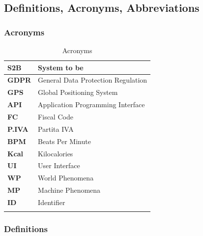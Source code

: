 \documentclass[titlepage]{article}
\begin{document}
	\subsection{Definitions, Acronyms, Abbreviations}
		
		\subsubsection{Acronyms}
	
		\begin{longtable}{| p{2 cm} | p{7 cm} |} \hline
			{\bf S2B} & System to be \\\hline
			{\bf GDPR} & General Data Protection Regulation \\ \hline
			{\bf GPS} & Global Positioning System \\ \hline
			{\bf API} & Application Programming Interface \\ \hline
			{\bf FC} & Fiscal Code \\ \hline
			{\bf P.IVA} & Partita IVA \\ \hline
			{\bf BPM} & Beats Per Minute \\ \hline
			{\bf Kcal} & Kilocalories \\ \hline
			{\bf UI} & User Interface \\ \hline
			{\bf WP} & World Phenomena \\ \hline
			{\bf MP} & Machine Phenomena \\ \hline
			{\bf ID} & Identifier \\ \hline
				
			\caption{Acronyms}	
						
		\end{longtable}
			
		\subsubsection{Definitions}
			
\end{document}

